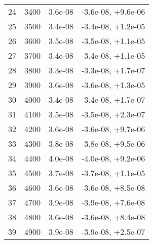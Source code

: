 \begin{table}
\begin{adjustbox}{width=1\textwidth/2}
\begin{tabular}{|c|c|c|c|}
\cline{1-4}
24 & 3400 & 3.6e-08 & -3.6e-08, +9.6e-06 \\
\cline{1-4}
25 & 3500 & 3.4e-08 & -3.4e-08, +1.2e-05 \\
\cline{1-4}
26 & 3600 & 3.5e-08 & -3.5e-08, +1.1e-05 \\
\cline{1-4}
27 & 3700 & 3.4e-08 & -3.4e-08, +1.1e-05 \\
\cline{1-4}
28 & 3800 & 3.3e-08 & -3.3e-08, +1.7e-07 \\
\cline{1-4}
29 & 3900 & 3.6e-08 & -3.6e-08, +1.3e-05 \\
\cline{1-4}
30 & 4000 & 3.4e-08 & -3.4e-08, +1.7e-07 \\
\cline{1-4}
31 & 4100 & 3.5e-08 & -3.5e-08, +2.3e-07 \\
\cline{1-4}
32 & 4200 & 3.6e-08 & -3.6e-08, +9.7e-06 \\
\cline{1-4}
33 & 4300 & 3.8e-08 & -3.8e-08, +9.5e-06 \\
\cline{1-4}
34 & 4400 & 4.0e-08 & -4.0e-08, +9.2e-06 \\
\cline{1-4}
35 & 4500 & 3.7e-08 & -3.7e-08, +1.1e-05 \\
\cline{1-4}
36 & 4600 & 3.6e-08 & -3.6e-08, +8.5e-08 \\
\cline{1-4}
37 & 4700 & 3.9e-08 & -3.9e-08, +7.6e-08 \\
\cline{1-4}
38 & 4800 & 3.6e-08 & -3.6e-08, +8.4e-08 \\
\cline{1-4}
39 & 4900 & 3.9e-08 & -3.9e-08, +2.5e-07 \\
\cline{1-4}
\end{tabular}
\end{adjustbox}
\end{table}

